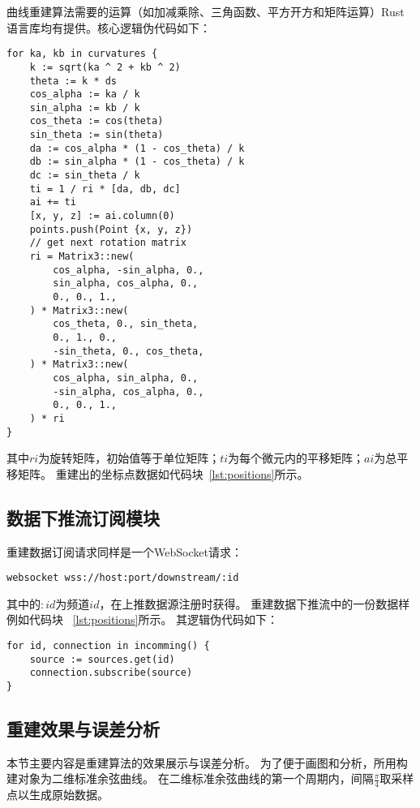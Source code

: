 曲线重建算法需要的运算（如加减乘除、三角函数、平方开方和矩阵运算）Rust语言库均有提供。核心逻辑伪代码如下：

\begin{lstlisting}[caption={曲线重建}]
for ka, kb in curvatures {
    k := sqrt(ka ^ 2 + kb ^ 2)
    theta := k * ds
    cos_alpha := ka / k
    sin_alpha := kb / k
    cos_theta := cos(theta)
    sin_theta := sin(theta)
    da := cos_alpha * (1 - cos_theta) / k
    db := sin_alpha * (1 - cos_theta) / k
    dc := sin_theta / k
    ti = 1 / ri * [da, db, dc]
    ai += ti
    [x, y, z] := ai.column(0)
    points.push(Point {x, y, z})
    // get next rotation matrix
    ri = Matrix3::new(
        cos_alpha, -sin_alpha, 0.,
        sin_alpha, cos_alpha, 0.,
        0., 0., 1.,
    ) * Matrix3::new(
        cos_theta, 0., sin_theta,
        0., 1., 0.,
        -sin_theta, 0., cos_theta,
    ) * Matrix3::new(
        cos_alpha, sin_alpha, 0.,
        -sin_alpha, cos_alpha, 0.,
        0., 0., 1.,
    ) * ri
}
\end{lstlisting}

其中$ri$为旋转矩阵，初始值等于单位矩阵；$ti$为每个微元内的平移矩阵；$ai$为总平移矩阵。
重建出的坐标点数据如代码块~\ref{lst:positions}所示。

\subsection{数据下推流订阅模块}

重建数据订阅请求同样是一个WebSocket请求：

\begin{lstlisting}[label={lst:subscribe},caption={重建数据订阅}]
websocket wss://host:port/downstream/:id
\end{lstlisting}

其中的$:id$为频道$id$，在上推数据源注册时获得。
重建数据下推流中的一份数据样例如代码块 ~\ref{lst:positions}所示。
其逻辑伪代码如下：

\begin{lstlisting}[caption={订阅数据源}]
for id, connection in incomming() {
    source := sources.get(id)
    connection.subscribe(source)
}
\end{lstlisting}

\subsection{重建效果与误差分析}
\label{sec:error-analyze}

本节主要内容是重建算法的效果展示与误差分析。
为了便于画图和分析，所用构建对象为二维标准余弦曲线。
在二维标准余弦曲线的第一个周期内，间隔$\frac{\pi}{4}$取采样点以生成原始数据。

